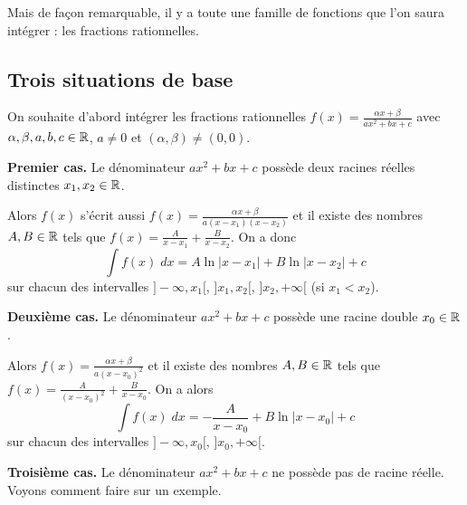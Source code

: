 \documentclass[class=report,crop=false]{standalone}
\begin{document}
\bigskip

Mais de façon remarquable, il y a toute une famille de fonctions que l'on saura
intégrer : les fractions rationnelles.


\subsection{Trois situations de base}

On souhaite d'abord intégrer les fractions rationnelles $f(x)=\frac{\alpha x + \beta}{a x^2+b x+c}$
avec $\alpha, \beta, a, b, c \in \mathbb{R}$, $a\neq 0$ et $(\alpha,\beta)\neq (0,0)$.

\textbf{Premier cas.} Le dénominateur $a x^2+b x+c$ possède deux racines réelles distinctes $x_1,x_ 2\in \mathbb{R}$.


Alors $f(x)$ s'écrit aussi $f(x)=\frac{\alpha x + \beta}{a(x - x_1)(x - x_2)}$ et il existe des nombres $A,B \in \mathbb{R}$
tels que $f(x)=\frac{A}{x - x_1}+\frac{B}{x -x_2}$. On a donc
$$\int f(x)\;dx = A \ln|x - x_1|+B\ln|x -x_2|+c$$
sur chacun des intervalles
$]-\infty,x_1[$, $]x_1,x_2[$, $]x_2,+\infty[$ (si $x_1<x_2$).


\bigskip

\textbf{Deuxième cas.} Le dénominateur $a x^2+b x+c$ possède une racine double $x_0 \in \mathbb{R}$.


Alors $f(x)=\frac{\alpha x + \beta}{a(x -x_0)^2}$ et il existe des nombres $A,B \in \mathbb{R}$
tels que $f(x)=\frac{A}{(x - x_0)^2}+\frac{B}{x - x_0}$. On a alors
$$\int f(x)\;dx = -\frac{A}{x - x_0} + B\ln|x - x_0|+c$$
sur chacun des intervalles
$]-\infty,x_0[$, $]x_0,+\infty[$.

\bigskip

\textbf{Troisième cas.}   Le dénominateur $a x^2+b x+c$ ne possède pas de racine réelle.
Voyons comment faire sur un exemple.
\end{document}
